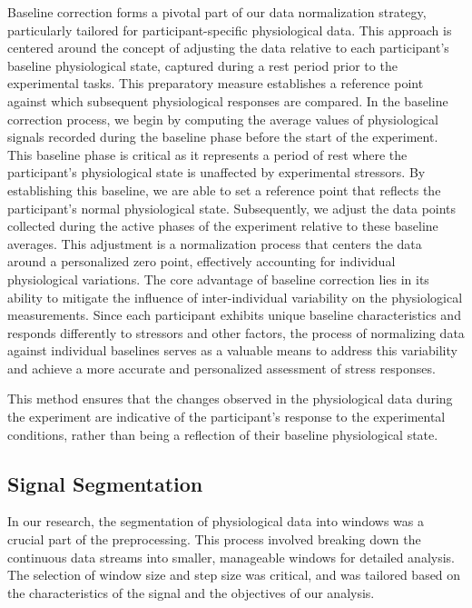 Baseline correction forms a pivotal part of our data normalization strategy, particularly tailored for participant-specific physiological data. This approach is centered around the concept of adjusting the data relative to each participant's baseline physiological state, captured during a rest period prior to the experimental tasks. This preparatory measure establishes a reference point against which subsequent physiological responses are compared.
In the baseline correction process, we begin by computing the average values of physiological signals recorded during the baseline phase before the start of the experiment. This baseline phase is critical as it represents a period of rest where the participant's physiological state is unaffected by experimental stressors. By establishing this baseline, we are able to set a reference point that reflects the participant's normal physiological state. Subsequently, we adjust the data points collected during the active phases of the experiment relative to these baseline averages. This adjustment is a normalization process that centers the data around a personalized zero point, effectively accounting for individual physiological variations. The core advantage of baseline correction lies in its ability to mitigate the influence of inter-individual variability on the physiological measurements. Since each participant exhibits unique baseline characteristics and responds differently to stressors and other factors, the process of normalizing data against individual baselines serves as a valuable means to address this variability and achieve a more accurate and personalized assessment of stress responses.

This method ensures that the changes observed in the physiological data during the experiment are indicative of the participant's response to the experimental conditions, rather than being a reflection of their baseline physiological state.

\subsection*{Signal Segmentation}
\label{sec:signal_segmentation}
In our research, the segmentation of physiological data into windows was a crucial part of the preprocessing. This process involved breaking down the continuous data streams into smaller, manageable windows for detailed analysis. The selection of window size and step size was critical, and was tailored based on the characteristics of the signal and the objectives of our analysis.

